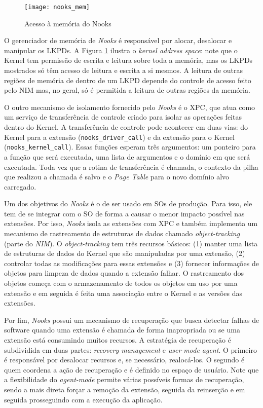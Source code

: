\begin{figure}[!h]
  \centering
  \texttt{[image: nooks\_mem]}
  \caption[Acesso à memória do Nooks]{Acesso à memória do Nooks \citep{nooks}}
  \label{fig:nooks_mem}
\end{figure}

O gerenciador de memória de \emph{Nooks} é responsável por alocar, desalocar e
manipular os LKPDs. A Figura \ref{fig:nooks_mem} ilustra o \textit{kernel
address space}: note que o Kernel tem permissão de escrita e leitura sobre toda
a memória, mas os LKPDs mostrados só têm acesso de leitura e escrita a si mesmos.
A leitura de outras regiões de memória de dentro de um LKPD depende do controle
de acesso feito pelo NIM mas, no geral, só é permitida a leitura de outras
regiões da memória.

O outro mecanismo de isolamento fornecido pelo \emph{Nooks} é o XPC, que atua
como um serviço de transferência de controle criado para isolar as operações
feitas dentro do Kernel. A transferência de controle pode acontecer em duas
vias: do Kernel para a extensão (\texttt{nooks\_driver\_call}) e da extensão
para o Kernel (\texttt{nooks\_kernel\_call}). Essas funções esperam
três argumentos: um ponteiro para a função que será executada, uma lista de
argumentos e o domínio em que será executada. Toda vez que a rotina de
transferência é chamada, o contexto da pilha que realizou a chamada é salvo e o
\emph{Page Table} para o novo domínio alvo carregado.

Um dos objetivos do \emph{Nooks} é o de ser usado em SOs de produção. Para isso,
ele tem de se integrar com o SO de forma a causar o menor impacto possível
nas extensões. Por isso, \emph{Nooks} isola as extensões com XPC e também
implementa um mecanismo de rastreamento de estruturas de dados chamado
\emph{object-tracking} (parte do \emph{NIM}). O \emph{object-tracking} tem três
recursos básicos: (1) manter uma lista de estruturas de dados do Kernel que são
manipuladas por uma extensão, (2) controlar todas as modificações para essas
extensões e (3) fornecer informações de objetos para limpeza de dados quando a
extensão falhar. O rastreamento dos objetos começa com o armazenamento de todos
os objetos em uso por uma extensão e em seguida é feita uma associação entre o
Kernel e as versões das extensões.

Por fim, \emph{Nooks} possui um mecanismo de recuperação que busca detectar
falhas de software quando uma extensão é chamada de forma inapropriada ou se
uma extensão está consumindo muitos recursos. A estratégia de recuperação é
subdividida em duas partes: \emph{recovery management} e \emph{user-mode
agent}. O primeiro é responsável por desalocar recursos e, se necessário,
realocá-los. O segundo é quem coordena a ação de recuperação e
é definido no espaço de usuário. Note que a flexibilidade do \emph{agent-mode}
permite várias possíveis formas de recuperação, sendo a mais direta forçar a
remoção da extensão, seguida da reinserção e em seguida prosseguindo com a
execução da aplicação.

